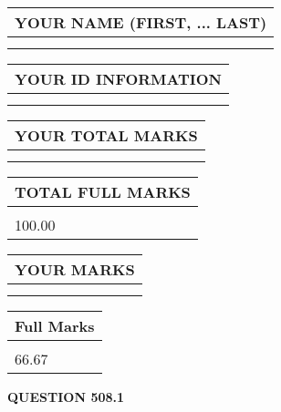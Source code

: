 \documentclass{ctexart}
\begin{document}
   
   
   
\newpage 
\setcounter{page}{ 
   508001 } 
   
   
   
   
\noindent\begin{tabular}{|l|}
\hline
YOUR NAME (FIRST, ... LAST)  \\
\hline
 \\ 
 \\ 
\hline
\end{tabular}
\hspace{0.05in} \begin{tabular}{|l|}
\hline
 YOUR   ID   INFORMATION  \\
\hline
 \\ 
 \\ 
\hline
\end{tabular}
   
   
\vspace{0.2in}\noindent\begin{tabular}{|l|}
\hline
YOUR TOTAL MARKS  \\
\hline
 \\ 
 \\ 
\hline
\end{tabular}
\hspace{0.05in} \begin{tabular}{|l|}
\hline
TOTAL FULL MARKS  \\
\hline
 \\ 
100.00 \\
\hline
\end{tabular}
   
   
 \vspace{0.2in}
 
 
 
 
   
   
  
\vspace{0.2in}
  
\noindent\begin{tabular}{|l|}
\hline
 YOUR MARKS  \\
\hline
 \\ 
 \\ 
\hline
\end{tabular}
\hspace{0.05in} \begin{tabular}{|l|}
\hline
 Full Marks  \\
\hline
 \\ 
66.67 \\
\hline
\end{tabular}
{\textbf{\Large{QUESTION
508.1 
}}}
  
\end{document}
